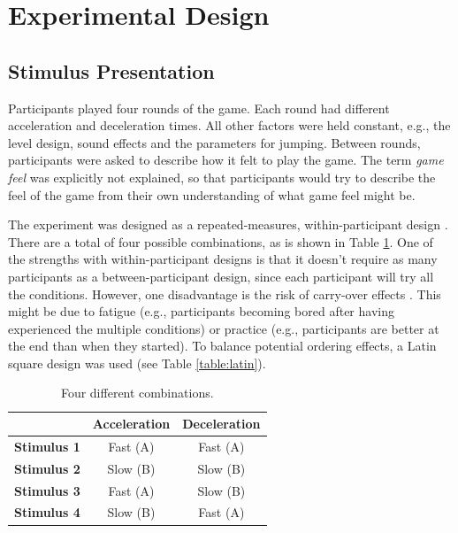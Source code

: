 \section{Experimental Design} \label{experimentalDesign}

\subsection{Stimulus Presentation}
Participants played four rounds of the game. Each round had different acceleration and deceleration times. All other factors were held constant, e.g., the level design, sound effects and the parameters for jumping. Between rounds, participants were asked to describe how it felt to play the game. The term \textit{game feel} was explicitly not explained, so that participants would try to describe the feel of the game from their own understanding of what game feel might be.

The experiment was designed as a repeated-measures, within-participant design \cite{cunningham}. There are a total of four possible combinations, as is shown in Table \ref{tab:combinations}. One of the strengths with within-participant designs is that it doesn't require as many participants as a between-participant design, since each participant will try all the conditions. However, one disadvantage is the risk of carry-over effects \cite{experimental1}. This might be due to fatigue (e.g., participants becoming bored after having experienced the multiple conditions) or practice (e.g., participants are better at the end than when they started). To balance potential ordering effects, a Latin square design was used (see Table \ref{table:latin}).

\begin{table} \centering
\caption{Four different combinations.}
\label{tab:combinations}
\begin{tabular}{ccc}
\toprule
& \textbf{Acceleration} & \textbf{Deceleration} \\
\midrule
\textbf{Stimulus 1} & Fast (A) & Fast (A)\\
\textbf{Stimulus 2} & Slow (B) & Slow (B)\\
\textbf{Stimulus 3} & Fast (A) & Slow (B)\\
\textbf{Stimulus 4} & Slow (B) & Fast (A)\\
\bottomrule
\end{tabular}
\end{table}

